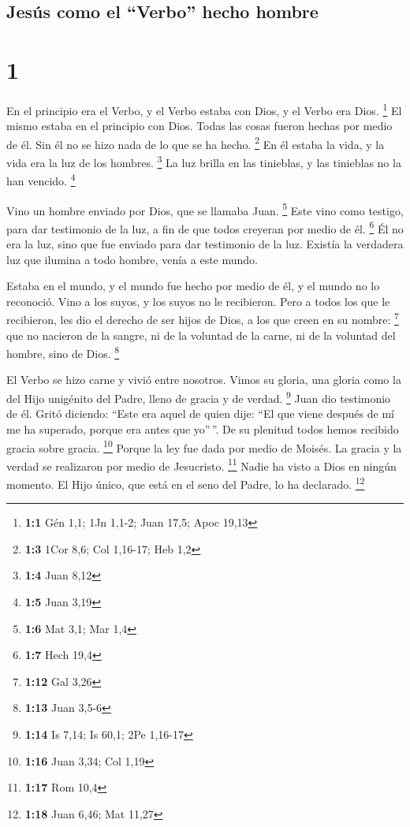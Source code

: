 \hypertarget{jesuxfas-como-el-verbo-hecho-hombre}{%
\subsection{Jesús como el ``Verbo'' hecho
hombre}\label{jesuxfas-como-el-verbo-hecho-hombre}}

\hypertarget{section}{%
\section{1}\label{section}}

 En el principio era el Verbo, y el Verbo estaba con Dios,
y el Verbo era Dios. \footnote{\textbf{1:1} Gén 1,1; 1Jn 1,1-2; Juan
  17,5; Apoc 19,13}  El mismo estaba en el principio con
Dios.  Todas las cosas fueron hechas por medio de él. Sin
él no se hizo nada de lo que se ha hecho. \footnote{\textbf{1:3} 1Cor
  8,6; Col 1,16-17; Heb 1,2}  En él estaba la vida, y la
vida era la luz de los hombres. \footnote{\textbf{1:4} Juan 8,12}
 La luz brilla en las tinieblas, y las tinieblas no la han
vencido. \footnote{\textbf{1:5} Juan 3,19}

 Vino un hombre enviado por Dios, que se llamaba Juan.
\footnote{\textbf{1:6} Mat 3,1; Mar 1,4}  Este vino como
testigo, para dar testimonio de la luz, a fin de que todos creyeran por
medio de él. \footnote{\textbf{1:7} Hech 19,4}  Él no era
la luz, sino que fue enviado para dar testimonio de la luz.
 Existía la verdadera luz que ilumina a todo hombre, venía
a este mundo.

 Estaba en el mundo, y el mundo fue hecho por medio de
él, y el mundo no lo reconoció.  Vino a los suyos, y los
suyos no le recibieron.  Pero a todos los que le
recibieron, les dio el derecho de ser hijos de Dios, a los que creen en
su nombre: \footnote{\textbf{1:12} Gal 3,26}  que no
nacieron de la sangre, ni de la voluntad de la carne, ni de la voluntad
del hombre, sino de Dios. \footnote{\textbf{1:13} Juan 3,5-6}

 El Verbo se hizo carne y vivió entre nosotros. Vimos su
gloria, una gloria como la del Hijo unigénito del Padre, lleno de gracia
y de verdad. \footnote{\textbf{1:14} Is 7,14; Is 60,1; 2Pe 1,16-17}
 Juan dio testimonio de él. Gritó diciendo: ``Este era
aquel de quien dije: ``El que viene después de mí me ha superado, porque
era antes que yo''\,''.  De su plenitud todos hemos
recibido gracia sobre gracia. \footnote{\textbf{1:16} Juan 3,34; Col
  1,19}  Porque la ley fue dada por medio de Moisés. La
gracia y la verdad se realizaron por medio de Jesucristo. \footnote{\textbf{1:17}
  Rom 10,4}  Nadie ha visto a Dios en ningún momento. El
Hijo único, que está en el seno del Padre, lo ha declarado. \footnote{\textbf{1:18}
  Juan 6,46; Mat 11,27}

